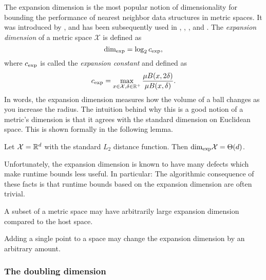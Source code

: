 \documentclass[../main.tex]{subfiles}
\newcommand{\set}[1]{\mathcal {#1}}
\newcommand{\krdim}{\text{dim}_\textnormal{exp}}
\newcommand{\cexp}{c_\textnormal{exp}}
\begin{document}
The expansion dimension is the most popular notion of dimensionality for bounding the performance of nearest neighbor data structures in metric spaces.
It was introduced by
\citet{karger2002finding},
and has been subsequently used in
\citet{krauthgamer2004navigating},
\citet{beygelzimer2006cover},
\citet{ram2009linear},
and \citet{curtin2015plug}.
The \emph{expansion dimension} of a metric space $\set X$ is defined as
\begin{equation}
    \krdim = \log_2 \cexp
    ,
\end{equation}
where $\cexp$ is called the \emph{expansion constant} and defined as
\begin{equation}
    \cexp = \max_{x\in\set X, \delta\in\R^+} \frac{\mu B(x,2\delta)}{\mu B(x,\delta)}
    .
\end{equation}
In words, the expansion dimension measures how the volume of a ball changes as you increase the radius.
The intuition behind why this is a good notion of a metric's dimension is that it agrees with the standard dimension on Euclidean space.
This is shown formally in the following lemma.
\begin{lemma}
    Let $\set X=\R^d$ with the standard $L_2$ distance function.
    Then $\krdim\set X=\Theta(d)$.
\end{lemma}
Unfortunately, the expansion dimension is known to have many defects which make runtime bounds less useful.
In particular:
The algorithmic consequence of these facts is that runtime bounds based on the expansion dimension are often trivial.

\begin{example}
    A subset of a metric space may have arbitrarily large expansion dimension compared to the host space.
\end{example}

\begin{example}
    Adding a single point to a space may change the expansion dimension by an arbitrary amount.
\end{example}


\subsubsection{The doubling dimension}
\end{document}
